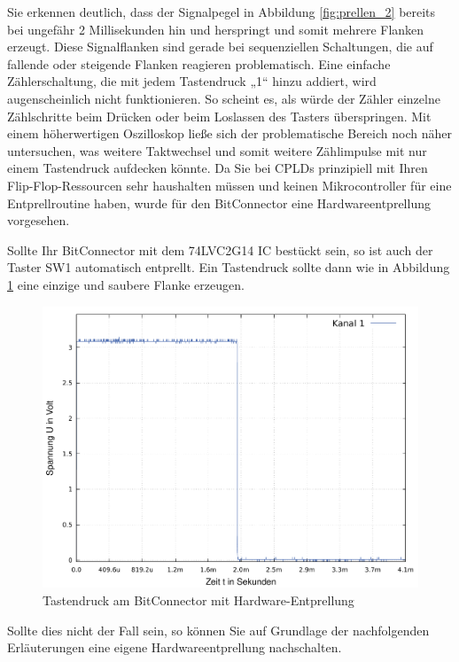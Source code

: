 \documentclass{article}
\begin{document}
Sie erkennen deutlich, dass der Signalpegel in Abbildung \ref{fig:prellen_2} bereits bei ungefähr 2 Millisekunden hin und herspringt und somit mehrere Flanken erzeugt. Diese Signalflanken sind gerade bei sequenziellen Schaltungen, die auf fallende oder steigende Flanken reagieren problematisch. Eine einfache Zählerschaltung, die mit jedem Tastendruck „1“ hinzu addiert, wird augenscheinlich nicht funktionieren. So scheint es, als würde der Zähler einzelne Zählschritte beim Drücken oder beim Loslassen des Tasters überspringen. Mit einem höherwertigen Oszilloskop ließe sich der problematische Bereich noch näher untersuchen, was weitere Taktwechsel und somit weitere Zählimpulse mit nur einem Tastendruck aufdecken könnte. 
Da Sie bei CPLDs prinzipiell mit Ihren Flip-Flop-Ressourcen sehr haushalten müssen und keinen Mikrocontroller für eine Entprellroutine haben, wurde für den BitConnector eine Hardwareentprellung vorgesehen. 

\newpage

Sollte Ihr BitConnector mit dem 74LVC2G14 IC bestückt sein, so ist auch der Taster SW1 automatisch entprellt. Ein Tastendruck sollte dann wie in Abbildung \ref{fig:prellen_3} eine einzige und saubere Flanke erzeugen. 


\begin{figure}[!h]
	\centering
	\includegraphics[width=0.92\linewidth]{Figures/debounce}
	\caption{Tastendruck am BitConnector mit Hardware-Entprellung}
	\label{fig:prellen_3}
\end{figure}

Sollte dies nicht der Fall sein, so können Sie auf Grundlage der nachfolgenden Erläuterungen eine eigene Hardwareentprellung nachschalten.
\end{document}
